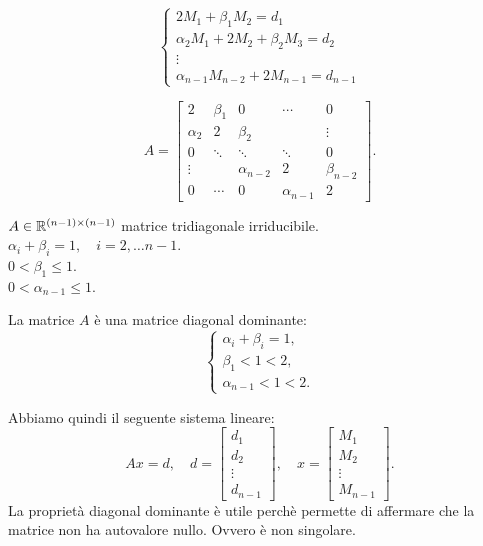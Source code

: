 \[\left\{
\begin{array}{l}
2M_1 + \beta_1M_2 = d_1 \\
\alpha_2M_1 + 2M_2 + \beta_2M_3 = d_2 \\
\vdots \\
\alpha_{n-1}M_{n-2}+ 2M_{n-1} = d_{n-1}
\end{array}
\right.\]

\[A = 
\left[
\begin{array}{ccccc}
 2 & \beta_1 & 0  &\cdots & 0 \\
\alpha_2 & 2 & \beta_2 & & \vdots \\
0 &\ddots &\ddots &\ddots &  0\\
\vdots & &\alpha_{n-2} & 2& \beta_{n-2}\\
0 & \cdots & 0 &\alpha_{n-1} & 2
\end{array}
\right].
\]

$A \in \mathbb{R}^{(n-1)\times(n-1)}$ matrice tridiagonale irriducibile.\\

$\alpha_i + \beta_i = 1, \quad i = 2,\ldots n-1$.\\

$0 < \beta_1 \leq 1$.\\

$0 < \alpha_{n-1} \leq 1$.

\begin{osse}
La matrice $A$ è una matrice diagonal dominante:
\[
\left\{ \begin{array}{l}
\alpha_i + \beta_i = 1, \\
\beta_1 < 1 < 2,\\
\alpha_{n-1} < 1 < 2.
\end{array}\right.
\]
\end{osse}

Abbiamo quindi il seguente sistema lineare:
\[
Ax = d, \quad d = \left[\begin{array}{c}
d_1 \\
d_2 \\
\vdots \\
d_{n-1}
\end{array}
\right], \quad 
x = \left[\begin{array}{c}
M_1 \\
M_2 \\
\vdots \\
M_{n-1}
\end{array}
\right].
\]
La proprietà diagonal dominante è utile perchè permette di affermare che la
matrice non ha autovalore nullo. Ovvero è non singolare.


